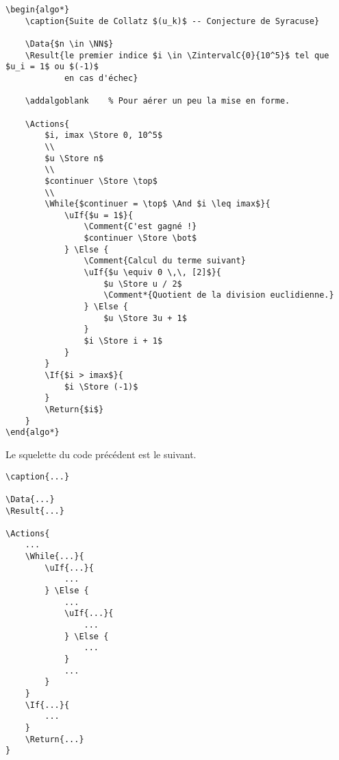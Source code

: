 \documentclass[12pt,a4paper]{article}
\theoremstyle{definition}
\newenvironment{frame-gene}[1][]{
	\begin{tcolorbox}[
		title        = #1, 
		colbacktitle = black!10!white, 
		colback      = white, 
		coltitle     = black,
		fonttitle    = \bfseries\itshape\small, 
		breakable,
		center title]
}{
	\end{tcolorbox}
}
\begin{document}
\begin{frame-gene}
    \small
\begin{verbatim}
\begin{algo*}
    \caption{Suite de Collatz $(u_k)$ -- Conjecture de Syracuse}

    \Data{$n \in \NN$}
    \Result{le premier indice $i \in \ZintervalC{0}{10^5}$ tel que $u_i = 1$ ou $(-1)$
            en cas d'échec}

    \addalgoblank    % Pour aérer un peu la mise en forme.

    \Actions{
        $i, imax \Store 0, 10^5$
        \\
        $u \Store n$
        \\
        $continuer \Store \top$
        \\
        \While{$continuer = \top$ \And $i \leq imax$}{
            \uIf{$u = 1$}{
                \Comment{C'est gagné !}
                $continuer \Store \bot$
            } \Else {
                \Comment{Calcul du terme suivant}
                \uIf{$u \equiv 0 \,\, [2]$}{
                    $u \Store u / 2$
                    \Comment*{Quotient de la division euclidienne.}
                } \Else {
                    $u \Store 3u + 1$
                }
                $i \Store i + 1$
            }
        }
        \If{$i > imax$}{
            $i \Store (-1)$
        }
        \Return{$i$}
    }
\end{algo*}
\end{verbatim}
\end{frame-gene}


Le squelette du code précédent est le suivant. 


\begin{frame-gene}
    \small
\begin{verbatim}
\caption{...}

\Data{...}
\Result{...}

\Actions{
    ...
    \While{...}{
        \uIf{...}{
            ...
        } \Else {
            ...
            \uIf{...}{
                ...
            } \Else {
                ...
            }
            ...
        }
    }
    \If{...}{
        ...
    }
    \Return{...}
}
\end{verbatim}
\end{frame-gene}




\end{document}
